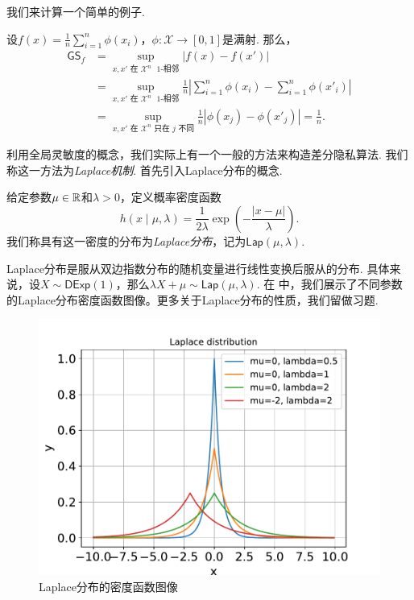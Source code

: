 我们来计算一个简单的例子.
\begin{example}
设$f(x)= \frac1n \sum_{i=1}^n \phi(x_i)$，$\phi : \mathcal X\to [0,1]$是满射. 那么，
\begin{align*}
    \mathsf{GS}_f&=\sup_{x, x' \text{ 在 }\mathcal X^n\text{ $1$-相邻}} |f(x) - f(x')|\\
    &= \sup_{x, x' \text{ 在 }\mathcal X^n\text{ $1$-相邻}} \frac1n \left|\sum_{i=1}^n \phi(x_i) - \sum_{i=1}^n \phi(x'_i)\right|\\
    &= \sup_{x, x' \text{ 在 }\mathcal X^n\text{ 只在 } j\text{ 不同}} \frac1n \left|\phi(x_j) - \phi(x'_j)\right| = \frac1n.
\end{align*}
\end{example}

利用全局灵敏度的概念，我们实际上有一个一般的方法来构造差分隐私算法. 我们称这一方法为\emph{Laplace机制}. 首先引入Laplace分布的概念.

\begin{definition}[Laplace分布]
    给定参数$\mu\in\mathbb{R}$和$\lambda>0$，定义概率密度函数
        \[h(x \mid \mu, \lambda) = \frac1{2\lambda}\exp\left(- \frac{|x - \mu|}{\lambda}\right).\]
我们称具有这一密度的分布为\emph{Laplace分布}，记为$\mathsf{Lap}(\mu,\lambda)$.
\end{definition}

Laplace分布是服从双边指数分布的随机变量进行线性变换后服从的分布. 具体来说，设$X\sim\mathsf{DExp}(1)$，那么$\lambda X+\mu\sim\mathsf{Lap}(\mu,\lambda)$. 在 中，我们展示了不同参数的Laplace分布密度函数图像。更多关于Laplace分布的性质，我们留做习题. 

\begin{figure}[ht]
    \centering
    \includegraphics[scale=0.6]{Chapters/differential-privacy/figures/LaplaceDist.pdf}
    
    \caption{Laplace分布的密度函数图像}
    \label{fig:Laplace-distribution}
\end{figure}

